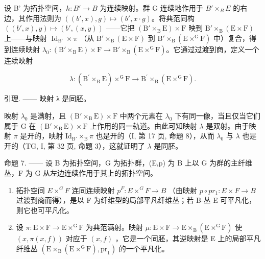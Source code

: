 设 B' 为拓扑空间，\(h\colon B'\to B\) 为连续映射。群 G 连续地作用于 \(B'\times_{B}E\) 的右边，其作用法则为 \(((b',x),g)\mapsto(b',x\cdot g)\)。将典范同构 \(((b',x),y)\mapsto(b',(x,y))\) ——它把 \((\mathrm{B}'\times_{\mathrm{B}}\mathrm{E})\times\mathrm{F}\) 映到 \(\mathrm{B}'\times_{\mathrm{B}}(\mathrm{E}\times\mathrm{F})\) 上——与映射 \(\operatorname{Id}_{\mathrm{B}'}\times\pi\) （从 \(\mathrm{B}'\times_{\mathrm{B}}(\mathrm{E}\times\mathrm{F})\) 到 \(\mathrm{B}'\times_{\mathrm{B}}(\mathrm{E}\times^{\mathrm{G}}\mathrm{F})\) 中）复合，得到连续映射 \(\lambda_{0}\colon(\mathrm{B}'\times_{\mathrm{B}}\mathrm{E})\times\mathrm{F}\to\mathrm{B}'\times_{\mathrm{B}}(\mathrm{E}\times^{\mathrm{G}}\mathrm{F})\)。它通过过渡到商，定义一个连续映射

\[
\lambda \colon (\mathrm{B} ^ {\prime} \times_ {\mathrm{B}} \mathrm{E}) \times^ {\mathrm{G}} \mathrm{F} \rightarrow \mathrm{B} ^ {\prime} \times_ {\mathrm{B}} (\mathrm{E} \times^ {\mathrm{G}} \mathrm{F}).
\]

引理. —— 映射 λ 是同胚。

映射 \(\lambda_0\) 是满射，且 \((\mathrm{B}' \times_{\mathrm{B}} \mathrm{E}) \times \mathrm{F}\) 中两个元素在 \(\lambda_0\) 下有同一像，当且仅当它们属于 G 在 \((\mathrm{B}' \times_{\mathrm{B}} \mathrm{E}) \times \mathrm{F}\) 上作用的同一轨道。由此可知映射 \(\lambda\) 是双射。由于映射 \(\pi\) 是开的，映射 \(\mathrm{Id}_{\mathrm{B}'} \times_{\mathrm{B}} \pi\) 也是开的（I, 第 17 页, 命题 8），从而 \(\lambda_0\) 与 \(\lambda\) 也是开的（TG, I, 第 32 页, 命题 3），这就证明了 \(\lambda\) 是同胚。

命题 7. —— 设 B 为拓扑空间，G 为拓扑群，(E,p) 为 B 上以 G 为群的主纤维丛，F 为 G 从左边连续作用于其上的拓扑空间。

\begin{enumerate}
\def\labelenumi{\alph{enumi})}
\item
  拓扑空间 \(E \times^{G} F\) 连同连续映射 \(p^{F}: E \times^{G} F \to B\) （由映射 \(p \circ pr_{1}: E \times F \to B\) 过渡到商而得），是以 F 为纤维型的局部平凡纤维丛；若 B-丛 E 可平凡化，则它也可平凡化。
\item
  设 \(\pi\colon\mathrm{E}\times\mathrm{F}\to\mathrm{E}\times^{\mathrm{G}}\mathrm{F}\) 为典范满射。映射 \(\mu\colon\mathrm{E}\times\mathrm{F}\to\mathrm{E}\times_{\mathrm{B}}(\mathrm{E}\times^{\mathrm{G}}\mathrm{F})\) 使 \((x,\pi(x,f))\) 对应于 \((x,f)\) ，它是一个同胚，其逆映射是 E 上的局部平凡纤维丛 \((\mathrm{E}\times_{\mathrm{B}}(\mathrm{E}\times^{\mathrm{G}}\mathrm{F}),\mathrm{pr}_{1})\) 的一个平凡化。
\end{enumerate}

